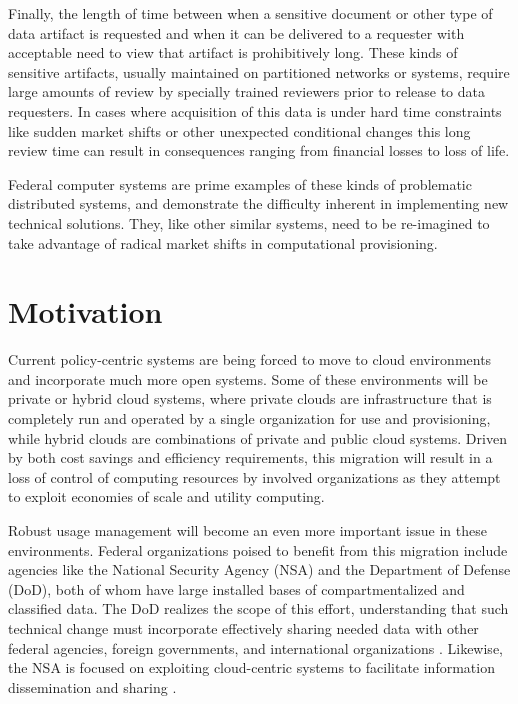 \documentclass[12pt,letterpaper]{article}
\begin{document}
Finally, the length of time between when a sensitive document or other type of data artifact is requested and when it can be delivered to a requester with acceptable need to view that artifact is prohibitively long.  These kinds of sensitive artifacts, usually maintained on partitioned networks or systems, require large amounts of review by specially trained reviewers prior to release to data requesters.  In cases where acquisition of this data is under hard time constraints like sudden market shifts or other unexpected conditional changes this long review time can result in consequences ranging from financial losses to loss of life.

Federal computer systems are prime examples of these kinds of problematic distributed systems, and demonstrate the difficulty inherent in implementing new technical solutions.  They, like other similar systems, need to be re-imagined to take advantage of radical market shifts in computational provisioning.

\section{Motivation}
Current policy-centric systems are being forced to move to cloud environments and incorporate much more open systems.  Some of these environments will be private or hybrid cloud systems, where private clouds are infrastructure that is completely run and operated by a single organization for use and provisioning, while hybrid clouds are combinations of private and public cloud systems.  Driven by both cost savings and efficiency requirements, this migration will result in a loss of control of computing resources by involved organizations as they attempt to exploit economies of scale and utility computing.

Robust usage management will become an even more important issue in these environments.  Federal organizations poised to benefit from this migration include agencies like the National Security Agency (NSA) and the Department of Defense (DoD), both of whom have large installed bases of compartmentalized and classified data.  The DoD realizes the scope of this effort, understanding that such technical change must incorporate effectively sharing needed data with other federal agencies, foreign governments, and international organizations \cite{proposal:info-sharing-strategy}.  Likewise, the NSA is focused on exploiting cloud-centric systems to facilitate information dissemination and sharing \cite{proposal:nsa-cloud}.
\end{document}
